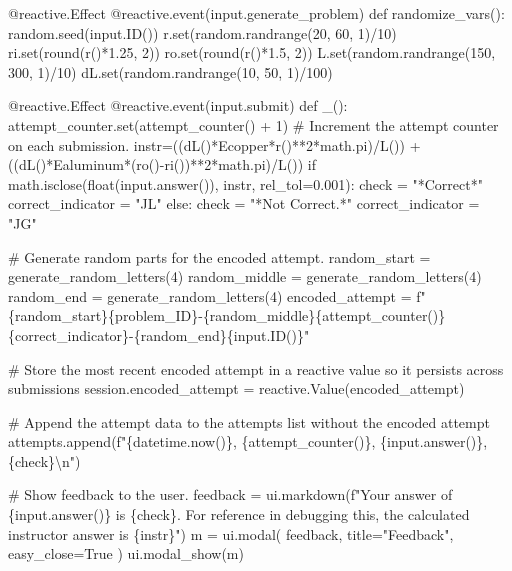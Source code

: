 \documentclass[
  letterpaper,
  DIV=11,
  numbers=noendperiod]{scrreprt}
\newenvironment{Shaded}{\begin{snugshade}}{\end{snugshade}}
\newcommand{\NormalTok}[1]{\textcolor[rgb]{0.00,0.23,0.31}{#1}}
\begin{document}
\begin{Shaded}
\begin{Highlighting}[]
\NormalTok{    @reactive.Effect}
\NormalTok{    @reactive.event(input.generate\_problem)}
\NormalTok{    def randomize\_vars():}
\NormalTok{        random.seed(input.ID())}
\NormalTok{        r.set(random.randrange(20, 60, 1)/10)}
\NormalTok{        ri.set(round(r()*1.25, 2))}
\NormalTok{        ro.set(round(r()*1.5, 2))}
\NormalTok{        L.set(random.randrange(150, 300, 1)/10)}
\NormalTok{        dL.set(random.randrange(10, 50, 1)/100)}
        
\NormalTok{    @reactive.Effect}
\NormalTok{    @reactive.event(input.submit)}
\NormalTok{    def \_():}
\NormalTok{        attempt\_counter.set(attempt\_counter() + 1)  \# Increment the attempt counter on each submission.}
\NormalTok{        instr=((dL()*Ecopper*r()**2*math.pi)/L()) + ((dL()*Ealuminum*(ro(){-}ri())**2*math.pi)/L())}
\NormalTok{        if math.isclose(float(input.answer()), instr, rel\_tol=0.001):}
\NormalTok{            check = "*Correct*"}
\NormalTok{            correct\_indicator = "JL"}
\NormalTok{        else:}
\NormalTok{            check = "*Not Correct.*"}
\NormalTok{            correct\_indicator = "JG"}

\NormalTok{        \# Generate random parts for the encoded attempt.}
\NormalTok{        random\_start = generate\_random\_letters(4)}
\NormalTok{        random\_middle = generate\_random\_letters(4)}
\NormalTok{        random\_end = generate\_random\_letters(4)}
\NormalTok{        encoded\_attempt = f"\{random\_start\}\{problem\_ID\}{-}\{random\_middle\}\{attempt\_counter()\}\{correct\_indicator\}{-}\{random\_end\}\{input.ID()\}"}

\NormalTok{        \# Store the most recent encoded attempt in a reactive value so it persists across submissions}
\NormalTok{        session.encoded\_attempt = reactive.Value(encoded\_attempt)}

\NormalTok{        \# Append the attempt data to the attempts list without the encoded attempt}
\NormalTok{        attempts.append(f"\{datetime.now()\}, \{attempt\_counter()\}, \{input.answer()\}, \{check\}\textbackslash{}n")}

\NormalTok{        \# Show feedback to the user.}
\NormalTok{        feedback = ui.markdown(f"Your answer of \{input.answer()\} is \{check\}. For reference in debugging this, the calculated instructor answer is \{instr\}")}
\NormalTok{        m = ui.modal(}
\NormalTok{            feedback,}
\NormalTok{            title="Feedback",}
\NormalTok{            easy\_close=True}
\NormalTok{        )}
\NormalTok{        ui.modal\_show(m)}


\end{Highlighting}
\end{Shaded}
\end{document}
